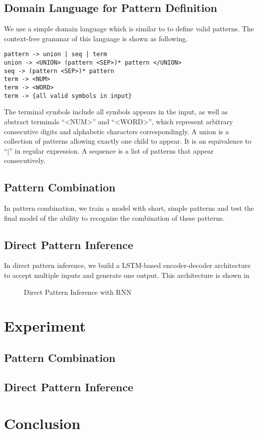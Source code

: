 \documentclass{article}
\begin{document}
\subsection{Domain Language for Pattern Definition}  
We use a simple domain language which is similar to \cite{dirt_2008}  to define valid patterns. The context-free grammar of this language is shown as following.
\begin{lstlisting}
pattern -> union | seq | term
union -> <UNION> (pattern <SEP>)* pattern </UNION>
seq -> (pattern <SEP>)* pattern
term -> <NUM>
term -> <WORD>
term -> {all valid symbols in input}
\end{lstlisting}
The terminal symbols include all symbols appears in the input, as well as abstract terminals ``\textless NUM\textgreater'' and ``\textless WORD\textgreater'', which represent arbitrary consecutive digits and alphabetic characters correspondingly. A union is a collection of patterns allowing exactly one child to appear. It is an equivalence to ``$\vert$'' in regular expression. A sequence is a list of patterns that appear consecutively.

\subsection{Pattern Combination}\label{sec:combo}

In pattern combination, we train a model with short, simple patterns and test the final model of the ability to recognize the combination of these patterns.


\subsection{Direct Pattern Inference}\label{sec:pattern}

In direct pattern inference, we build a LSTM-based encoder-decoder architecture to accept multiple inputs and generate one output. This architecture is shown in 

\begin{figure}
\centering
\begin{tikzpicture}

\end{tikzpicture}
\caption{Direct Pattern Inference with RNN}
\label{fig:dpi_lstm}
\end{figure}
\section{Experiment}\label{sec:experiment}
\subsection{Pattern Combination}

\subsection{Direct Pattern Inference}
\section{Conclusion}\label{sec:conclusion}



\end{document}
